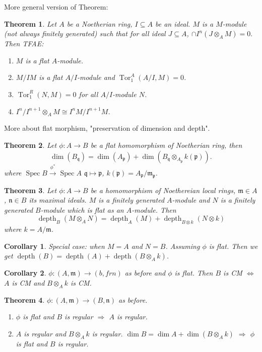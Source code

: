 \documentclass[cs4size]{article}
\newcommand{\su}{\subseteq}
\newcommand{\frm}{\mathfrak{m}}
\newcommand{\frp}{\mathfrak{p}}
\newcommand{\frq}{\mathfrak{q}}
\newcommand{\frn}{\mathfrak{n}}
\newcommand{\ra}{\rightarrow}
\newcommand{\xr}{\xrightarrow}
\DeclareMathOperator{\Tor}{Tor}
\DeclareMathOperator{\Spec}{Spec}
\DeclareMathOperator{\depth}{depth}
\newtheorem{thm}{Theorem}
\newtheorem{cor}{Corollary}
\begin{document}
More general version of Theorem:
\begin{thm}
Let $A$ be a Noetherian ring, $I\su A$ be an ideal. $M$ is a $M$-module (not always finitely generated) such that for all ideal $J\su A$, $\cap I^n(J\otimes_AM)=0.$ Then TFAE:
\begin{enumerate}
\item $M$ is a flat $A$-module.
\item $M/IM$ is a flat $A/I$-module and $\Tor_1^A(A/I,M)=0$.
\item $\Tor_1^R(N,M)=0$ for all $A/I$-module $N$.
\item $I^n/I^{n+1}\otimes_AM\cong I^nM/I^{n+1}M$.
\end{enumerate}
\end{thm}

More about flat morphism, "preservation of dimension and depth".
\begin{thm}
Let $\phi: A\ra B$ be a flat homomorphism of Noetherian ring, then \[\dim (B_\frq)=\dim (A_\frp)+\dim (B_\frq\otimes_{A_\frp}k(\frp)).\]
where $\Spec B\xr{\phi^*}\Spec A$ $\frq\mapsto \frp$, $k(\frp)=A_\frp/\frm_{\frp}$.
\end{thm}
\begin{thm}
Let $\phi: A\ra B$ be a homomorphism of Noethereian local rings, $\frm\in A$, $\frn\in B$ its maximal ideals. $M$ is a finitely generated $A$-module and $N$ is a finitely generated $B$-module which is flat as an $A$-module. Then \[\depth_B(M\otimes_AN)=\depth_A(M)+\depth_{B\otimes k}(N\otimes k)\] where $k=A/\frm$.
\end{thm}
\begin{cor}
Special case: when $M=A$ and $N=B$. Assuming $\phi$ is flat. Then we get $\depth(B)=\depth(A)+\depth(B\otimes_Ak)$.
\end{cor}
\begin{cor}
$\phi: (A,\frm)\ra (b,frn)$ as before and $\phi$ is flat. Then $B$ is CM $\Leftrightarrow$ $A$ is CM and $B\otimes_Ak$ is CM.
\end{cor}
\begin{thm}
$\phi: (A,\frm)\ra (B,\frn)$ as before.
\begin{enumerate}
\item $\phi$ is flat and $B$ is regular $\Rightarrow$ $A$ is regular.
\item $A$ is regular and $B\otimes_Ak$ is regular. $\dim B=\dim A+\dim (B\otimes_Ak)$ $\Rightarrow$ $\phi$ is flat and $B$ is regular.
\end{enumerate}
\end{thm}
\end{document}
